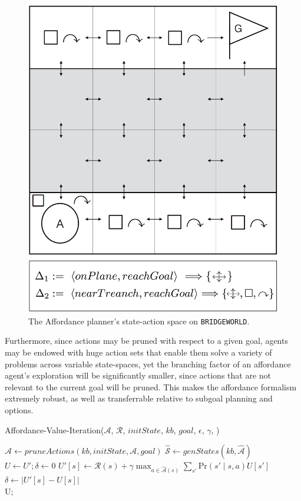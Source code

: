 \documentclass[]{article}
\begin{document}
\begin{figure}
\centering
\includegraphics[scale=0.22]{figures/bridgeworld_aff.png}
\caption{The Affordance planner's state-action space on \texttt{BRIDGEWORLD}.}
\label{fig:bridgeworld_aff}
\end{figure}

Furthermore, since actions may be pruned with respect to a given goal, agents may be
endowed with huge action sets that enable them solve a variety of
problems across variable state-spaces, yet the branching factor of an
affordance agent's exploration will be significantly smaller, since
actions that are not relevant to the current goal will be pruned. This
makes the affordance formalism extremely robust, as well as
transferrable relative to subgoal planning and options.


\begin{algorithm}
  \caption{Affordance-Value-Iteration($\mathcal{A}$, $\mathcal{R}$, $initState$, $kb$, $goal$, $\epsilon$, $\gamma$, )}
  \begin{algorithmic}[1]
    \State $\hat{\mathcal{A}} \gets pruneActions(kb, initState, \mathcal{A}, goal)$
    \State $\hat{\mathcal{S}} \gets genStates(kb, \hat{\mathcal{A}})$
    \State $U \gets U';\delta \gets 0$
    \State $U'[s] \leftarrow \mathcal{R}(s) + \gamma \max_{a \in \hat{\mathcal{A}}(s)} \sum_{s'} \text{Pr}(s'\mid s,a) U[s']$
    	\State $\delta \gets |U'[s] - U[s]|$ 
    \EndIf
    \EndFor
    \EndWhile\\
    \Return U;
  \end{algorithmic}
  \label{alg:vi}
\end{algorithm}
\end{document}
